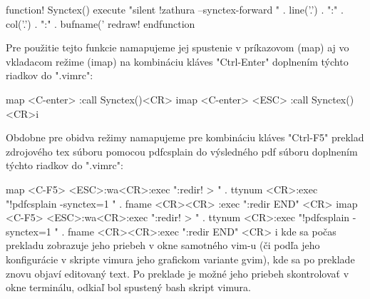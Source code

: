 \begtt
function! Synctex()
   execute "silent !zathura --synctex-forward " . line('.') . ":" . col('.') . ":" . bufname('%
  redraw! 
endfunction
\endtt

Pre použitie tejto funkcie namapujeme jej spustenie v príkazovom (map) aj vo
vkladacom režime (imap) na kombináciu kláves "Ctrl-Enter" doplnením týchto 
riadkov do ".vimrc":

\begtt
map <C-enter> :call Synctex()<CR>
imap <C-enter> <ESC> :call Synctex()<CR>i
\endtt

Obdobne pre obidva režimy namapujeme pre kombináciu kláves "Ctrl-F5" preklad
zdrojového tex súboru pomocou pdfcsplain do výsledného pdf súboru doplnením
týchto riadkov do ".vimrc":

\begtt
map <C-F5> <ESC>:wa<CR>:exec ":redir! > " . ttynum <CR>:exec "!pdfcsplain -synctex=1 " . fname <CR><CR> :exec ":redir END" <CR>
imap <C-F5> <ESC>:wa<CR>:exec ":redir! > " . ttynum <CR>:exec "!pdfcsplain -synctex=1 " . fname <CR><CR>:exec ":redir END" <CR> i
\endtt
kde sa počas prekladu zobrazuje jeho priebeh v okne samotného vim-u (či
podľa jeho konfigurácie v skripte vimura jeho grafickom variante gvim), kde
sa po preklade znovu objaví editovaný text. Po preklade je možné jeho
priebeh skontrolovať v okne terminálu, odkiaľ bol spustený bash skript vimura.

\bye
